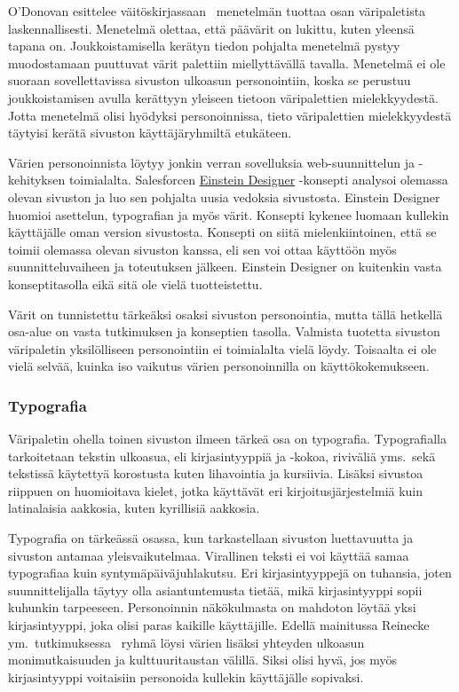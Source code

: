 \documentclass[finnish, 12pt, a4paper, elec, utf8, a-1b, online]{aaltothesis}
\begin{document}
O'Donovan esittelee väitöskirjassaan~\cite{odonovan_2015} menetelmän tuottaa
osan väripaletista laskennallisesti. Menetelmä olettaa, että päävärit on lukittu,
kuten yleensä tapana on. Joukkoistamisella kerätyn tiedon pohjalta menetelmä
pystyy muodostamaan puuttuvat värit palettiin miellyttävällä tavalla. Menetelmä
ei ole suoraan sovellettavissa sivuston ulkoasun personointiin, koska se
perustuu joukkoistamisen avulla kerättyyn yleiseen tietoon väripalettien
mielekkyydestä. Jotta menetelmä olisi hyödyksi personoinnissa, tieto
väripalettien mielekkyydestä täytyisi kerätä sivuston käyttäjäryhmiltä
etukäteen.

Värien personoinnista löytyy jonkin verran sovelluksia web-suunnittelun ja
-kehityksen toimialalta. Salesforcen
\href{https://medium.com/salesforce-ux/einstein-designer-ai-powered-personalized-design-at-scale-367d71b85a3d}{Einstein
    Designer} -konsepti analysoi olemassa olevan sivuston ja luo sen pohjalta
uusia vedoksia sivustosta. Einstein Designer huomioi asettelun, typografian ja
myös värit. Konsepti kykenee luomaan kullekin käyttäjälle oman version
sivustosta. Konsepti on siitä mielenkiintoinen, että se toimii olemassa olevan
sivuston kanssa, eli sen voi ottaa käyttöön myös suunnitteluvaiheen ja
toteutuksen jälkeen. Einstein Designer on kuitenkin vasta konseptitasolla eikä
sitä ole vielä tuotteistettu.

Värit on tunnistettu tärkeäksi osaksi sivuston personointia, mutta tällä
hetkellä osa-alue on vasta tutkimuksen ja konseptien tasolla. Valmista tuotetta
sivuston väripaletin yksilölliseen personointiin ei toimialalta vielä löydy.
Toisaalta ei ole vielä selvää, kuinka iso vaikutus värien personoinnilla on
käyttökokemukseen.

\subsubsection{Typografia}\label{typography-personalization}

Väripaletin ohella toinen sivuston ilmeen tärkeä osa on typografia.
Typografialla tarkoitetaan tekstin ulkoasua, eli kirjasintyyppiä ja -kokoa,
riviväliä yms.~sekä tekstissä käytettyä korostusta kuten lihavointia ja
kursiivia. Lisäksi sivustoa riippuen on huomioitava kielet, jotka käyttävät eri
kirjoitusjärjestelmiä kuin latinalaisia aakkosia, kuten kyrillisiä aakkosia.

Typografia on tärkeässä osassa, kun tarkastellaan sivuston luettavuutta ja
sivuston antamaa yleisvaikutelmaa. Virallinen teksti ei voi käyttää samaa
typografiaa kuin syntymäpäiväjuhlakutsu. Eri kirjasintyyppejä on tuhansia, joten
suunnittelijalla täytyy olla asiantuntemusta tietää, mikä kirjasintyyppi sopii
kuhunkin tarpeeseen. Personoinnin näkökulmasta on mahdoton löytää yksi
kirjasintyyppi, joka olisi paras kaikille käyttäjille. Edellä mainitussa
Reinecke ym.~tutkimuksessa~\cite{10.1145/2556288.2557052} ryhmä löysi värien
lisäksi yhteyden ulkoasun monimutkaisuuden ja kulttuuritaustan välillä. Siksi
olisi hyvä, jos myös kirjasintyyppi voitaisiin personoida kullekin käyttäjälle
sopivaksi.
\end{document}

